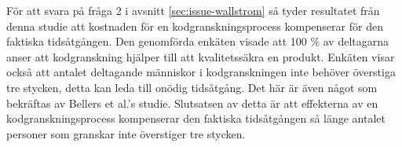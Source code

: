För att svara på fråga 2 i avsnitt \ref{sec:issue-wallstrom} så tyder resultatet från denna studie att kostnaden för en kodgranskningsprocess kompenserar för den faktiska tidsåtgången. Den genomförda enkäten visade att 100 \% av deltagarna anser att kodgranskning hjälper till att kvalitetssäkra en produkt. Enkäten visar också att antalet deltagande människor i kodgranskningen inte behöver överstiga tre stycken, detta kan leda till onödig tidsåtgång. Det här är även något som bekräftas av Bellers et al.'s \cite{beller2014modern} studie. Slutsatsen av detta är att effekterna av en kodgranskningsprocess kompenserar den faktiska tidsåtgången så länge antalet personer som granskar inte överstiger tre stycken.


